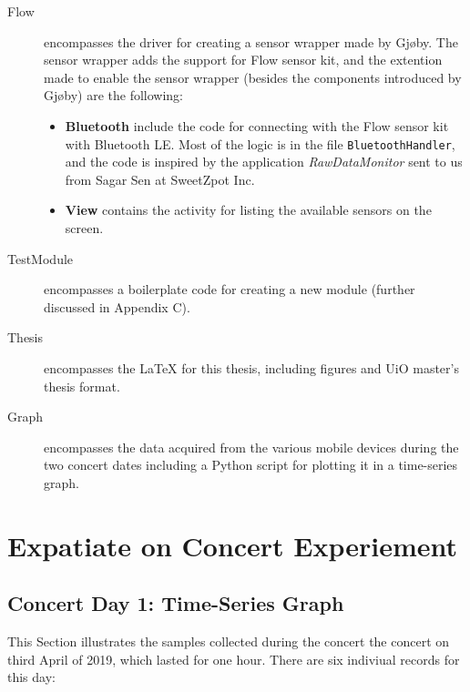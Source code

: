 \begin{description}
    \item[Flow] encompasses the driver for creating a sensor wrapper made by Gjøby. The sensor wrapper adds the support for Flow sensor kit, and the extention made to enable the sensor wrapper (besides the components introduced by Gjøby) are the following:
    \begin{itemize}
        \item \textbf{Bluetooth} include the code for connecting with the Flow sensor kit with Bluetooth LE. Most of the logic is in the file \verb|BluetoothHandler|, and the code is inspired by the application \textit{RawDataMonitor} sent to us from Sagar Sen at SweetZpot Inc. 
        \item \textbf{View} contains the activity for listing the available sensors on the screen. 
    \end{itemize}

    \item[TestModule] encompasses a boilerplate code for creating a new module (further discussed in Appendix C).
    \item[Thesis] encompasses the LaTeX for this thesis, including figures and UiO master's thesis format.
    \item[Graph] encompasses the data acquired from the various mobile devices during the two concert dates including a Python script for plotting it in a time-series graph.

\end{description}

\chapter{Expatiate on Concert Experiement}

\section{Concert Day 1: Time-Series Graph}
This Section illustrates the samples collected during the concert the concert on third April of 2019, which lasted 
for one hour. There are six indiviual records for this day: 

